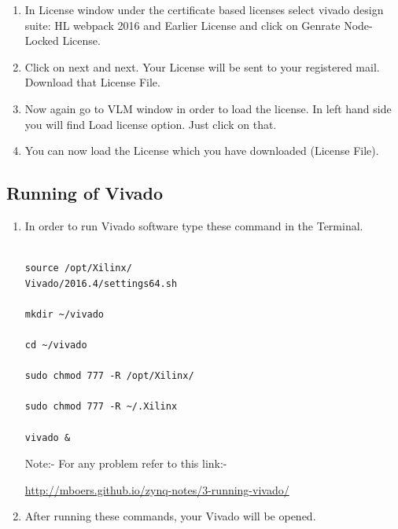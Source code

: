 \documentclass[journal,12pt,twocolumn]{IEEEtran}
\begin{document}
\begin{enumerate}
\item In License window under the certificate based licenses select vivado design suite: HL webpack 2016 and Earlier License and click on Genrate Node-Locked License.

\item Click on next and next. Your License will be sent to your registered mail.  Download that License File.

\item Now again go to VLM window in order to load the license.  In left hand side you will find Load license option. Just click on that.

\item You can now load the License which you have downloaded (License File).
\end{enumerate}

\subsection{Running of Vivado}
\begin{enumerate}
\item In order to run Vivado software type these command in the Terminal.

\begin{verbatim}

source /opt/Xilinx/
Vivado/2016.4/settings64.sh

mkdir ~/vivado

cd ~/vivado

sudo chmod 777 -R /opt/Xilinx/

sudo chmod 777 -R ~/.Xilinx

vivado &

\end{verbatim}

Note:- For any problem refer to this link:-

\url{http://mboers.github.io/zynq-notes/3-running-vivado/}

\item After running these commands, your Vivado will be opened.
\end{enumerate}
\end{document}
